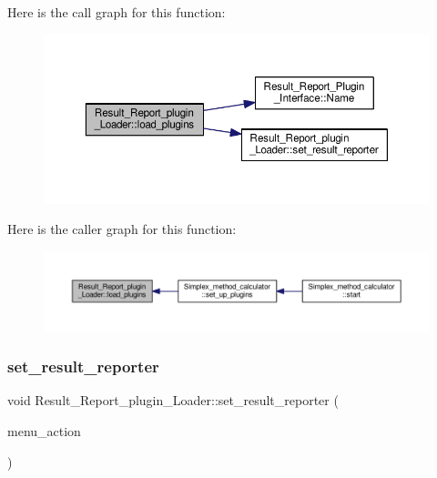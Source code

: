 Here is the call graph for this function\+:\nopagebreak
\begin{figure}[H]
\begin{center}
\leavevmode
\includegraphics[width=350pt]{classResult__Report__plugin__Loader_a15c218e7f32052f74d70fed200922fce_cgraph}
\end{center}
\end{figure}
Here is the caller graph for this function\+:\nopagebreak
\begin{figure}[H]
\begin{center}
\leavevmode
\includegraphics[width=350pt]{classResult__Report__plugin__Loader_a15c218e7f32052f74d70fed200922fce_icgraph}
\end{center}
\end{figure}
\mbox{\label{classResult__Report__plugin__Loader_a01bc8e810f4118732a39d4586730496c}} 
\subsubsection{\texorpdfstring{set\+\_\+result\+\_\+reporter}{set\_result\_reporter}}
{\footnotesize\ttfamily void Result\+\_\+\+Report\+\_\+plugin\+\_\+\+Loader\+::set\+\_\+result\+\_\+reporter (\begin{DoxyParamCaption}\item[{Q\+Action $\ast$}]{menu\+\_\+action }\end{DoxyParamCaption})\hspace{0.3cm}{\ttfamily [slot]}}



